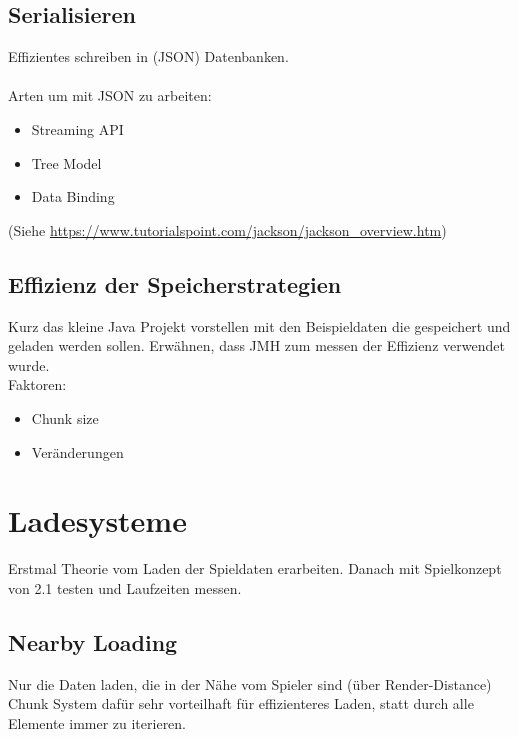\subsection{Serialisieren}
Effizientes schreiben in (JSON) Datenbanken.\\\\
Arten um mit JSON zu arbeiten:
\begin{itemize}
    \item Streaming API
    \item Tree Model
    \item Data Binding
\end{itemize}
(Siehe \url{https://www.tutorialspoint.com/jackson/jackson_overview.htm})


\subsection{Effizienz der Speicherstrategien}
Kurz das kleine Java Projekt vorstellen mit den Beispieldaten die gespeichert und geladen
werden sollen. Erwähnen, dass JMH zum messen der Effizienz verwendet wurde.\\

Faktoren:\\
\begin{itemize}
    \item Chunk size
    \item Veränderungen
\end{itemize}

\section{Ladesysteme}
Erstmal Theorie vom Laden der Spieldaten erarbeiten. Danach mit Spielkonzept
von 2.1 testen und Laufzeiten messen.


\subsection{Nearby Loading}
Nur die Daten laden, die in der Nähe vom Spieler sind (über Render-Distance)\\
Chunk System dafür sehr vorteilhaft für effizienteres Laden, statt durch alle Elemente
immer zu iterieren.


